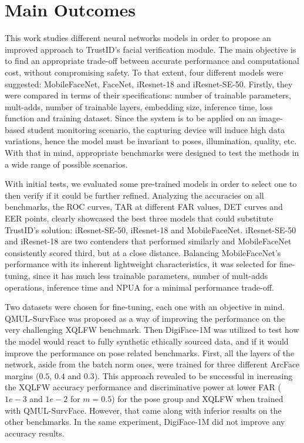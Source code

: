 \documentclass[class=report, crop=false, a4paper, 12pt]{standalone}
\begin{document}
\section{Main Outcomes}
\par This work studies different neural networks models in order to propose an improved approach to TrustID's facial verification module. The main objective is to find an appropriate trade-off between accurate performance and computational cost, without compromising safety. To that extent, four different models were suggested: MobileFaceNet, FaceNet, iResnet-18 and iResnet-SE-50. Firstly, they were compared in terms of their specifications: number of trainable parameters, mult-adds, number of trainable layers, embedding size, inference time, loss function and training dataset. Since the system is to be applied on an image-based student monitoring scenario, the capturing device will induce high data variations, hence the model must be invariant to poses, illumination, quality, etc. With that in mind, appropriate benchmarks were designed to test the methods in a wide range of possible scenarios.

\par With initial tests, we evaluated some pre-trained models in order to select one to then verify if it could be further refined. Analyzing the accuracies on all benchmarks, the ROC curves, TAR at different FAR values, DET curves and EER points, clearly showcased the best three models that could substitute TrustID's solution: iResnet-SE-50, iResnet-18 and MobileFaceNet. iResnet-SE-50 and iResnet-18 are two contenders that performed similarly and MobileFaceNet consistently scored third, but at a close distance. Balancing MobileFaceNet's performance with its inherent lightweight characteristics, it was selected for fine-tuning, since it has much less trainable parameters, number of mult-adds operations, inference time and NPUA for a minimal performance trade-off.

\par Two datasets were chosen for fine-tuning, each one with an objective in mind. QMUL-SurvFace was proposed as a way of improving the performance on the very challenging XQLFW benchmark. Then DigiFace-1M was utilized to test how the model would react to fully synthetic ethically sourced data, and if it would improve the performance on pose related benchmarks. First, all the layers of the network, aside from the batch norm ones, were trained for three different ArcFace margins ($0.5$, $0.4$ and $0.3$). This approach revealed to be successful in increasing the XQLFW accuracy performance and discriminative power at lower FAR ($1e-3$ and $1e-2$ for $m=0.5$) for the pose group and XQLFW when trained with QMUL-SurvFace. However, that came along with inferior results on the other benchmarks. In the same experiment, DigiFace-1M did not improve any accuracy results.  
\end{document}
